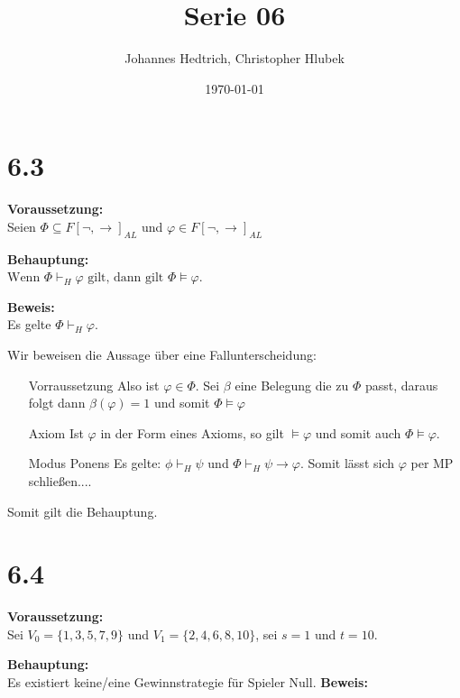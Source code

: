 \documentclass[12pt,a4paper]{scrartcl}
\title{Serie 06}
\author{Johannes Hedtrich, Christopher Hlubek}
\date{\today}
\begin{document}
\section*{6.3}
\noindent
\textbf{Voraussetzung:}\\
Seien $\Phi \subseteq F[\neg, \rightarrow]_{AL}$ und $\varphi \in F[\neg, \rightarrow]_{AL}$

\noindent
\textbf{Behauptung:}\\ 
$\text{Wenn } \Phi \vdash_H \varphi \text{ gilt, dann gilt }\Phi \models \varphi$.

\noindent
\textbf{Beweis:}\\
Es gelte $\Phi \vdash_H \varphi$.

Wir beweisen die Aussage über eine Fallunterscheidung:

\begin{enumerate}
  \item[Vorraussetzung] 
  Also ist $\varphi \in \Phi$. Sei $\beta$ eine Belegung die zu $\Phi$ passt, daraus folgt dann $\beta(\varphi)=1$ und somit $\Phi \models \varphi$
  \item[Axiom] Ist $\varphi$ in der Form eines Axioms, so gilt $\models \varphi$ und somit auch $\Phi \models \varphi$.
  \item[Modus Ponens] Es gelte: $\phi \vdash_H \psi$ und $\Phi \vdash_H \psi \rightarrow \varphi$. Somit lässt sich $\varphi$ per MP schließen....
\end{enumerate}

\noindent
Somit gilt die Behauptung.

\section*{6.4}

\textbf{Voraussetzung:}\\
Sei $V_0 = \{1,3,5,7,9\}$ und $V_1 = \{2,4,6,8,10\}$, sei $s = 1$ und $t = 10$.

\textbf{Behauptung:}\\ 
Es existiert keine/eine Gewinnstrategie für Spieler Null.
\noindent
\textbf{Beweis: }
\end{document}
